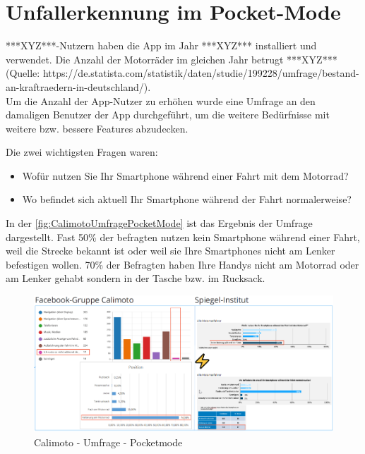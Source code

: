 \chapter{Unfallerkennung im Pocket-Mode}




***XYZ***-Nutzern haben die App im Jahr ***XYZ*** installiert und verwendet. Die Anzahl der Motorräder im gleichen Jahr betrugt ***XYZ*** \\ (Quelle: https://de.statista.com/statistik/daten/studie/199228/umfrage/bestand-an-kraftraedern-in-deutschland/). \\

Um die Anzahl der App-Nutzer zu erhöhen wurde eine Umfrage an den damaligen Benutzer der App durchgeführt, um die weitere Bedürfnisse mit weitere bzw. bessere Features abzudecken.

Die zwei wichtigsten Fragen waren:
\begin{itemize}
	\item Wofür nutzen Sie Ihr Smartphone während einer Fahrt mit dem Motorrad?
	\item Wo befindet sich aktuell Ihr Smartphone während der Fahrt normalerweise?
\end{itemize}

In der \autoref{fig:CalimotoUmfragePocketMode} ist das Ergebnis der Umfrage dargestellt. Fast 50\% der befragten nutzen kein Smartphone während einer Fahrt, weil die Strecke bekannt ist oder weil sie Ihre Smartphones nicht am Lenker befestigen wollen. 70\% der Befragten haben Ihre Handys nicht am Motorrad oder am Lenker gehabt sondern in der Tasche bzw. im Rucksack. 



\begin{figure}[H]
	\centering
	\includegraphics[width=\linewidth]{Bilder/CalimotoUmfragePocketMode.png}
	\caption{Calimoto - Umfrage - Pocketmode}
	\label{fig:CalimotoUmfragePocketMode}
\end{figure}

